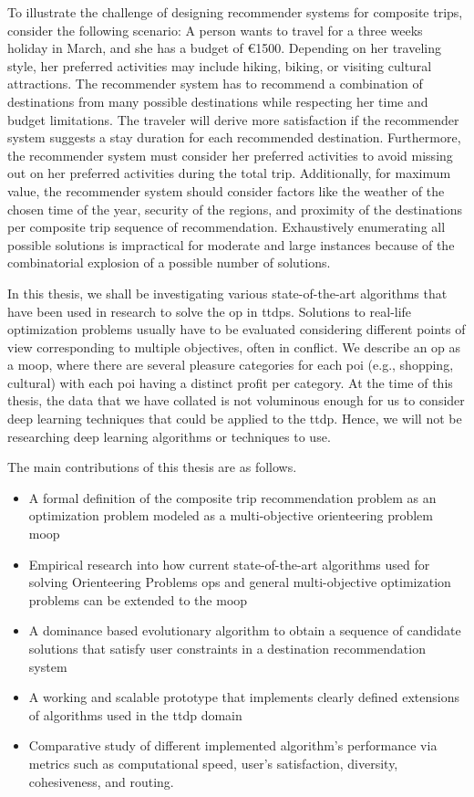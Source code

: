 To illustrate the challenge of designing recommender systems for composite trips, consider the following scenario: A person wants to travel for a three weeks holiday in March, and she has a budget of €1500. Depending on her traveling style, her preferred activities may include hiking, biking, or visiting cultural attractions. The recommender system has to recommend a combination of destinations from many possible destinations while respecting her time and budget limitations. The traveler will derive more satisfaction if the recommender system suggests a stay duration for each recommended destination. Furthermore, the recommender system must consider her preferred activities to avoid missing out on her preferred activities during the total trip. Additionally, for maximum value, the recommender system should consider factors like the weather of the chosen time of the year, security of the regions, and proximity of the destinations per composite trip sequence of recommendation. Exhaustively enumerating all possible solutions is impractical for moderate and large instances because of the combinatorial explosion of a possible number of solutions.

In this thesis, we shall be investigating various state-of-the-art algorithms that have been used in research to solve the \gls{op} in \glspl{ttdp}. Solutions to real-life optimization problems usually have to be evaluated considering different points of view corresponding to multiple objectives, often in conflict.  We describe an \gls{op} as a \gls{moop}, where there are several pleasure categories for each \gls{poi} (e.g., shopping, cultural) with each \gls{poi} having a distinct profit per category. At the time of this thesis, the data that we have collated is not voluminous enough for us to consider deep learning techniques that could be applied to the \gls{ttdp}. Hence, we will not be researching deep learning algorithms or techniques to use.

The main contributions of this thesis are as follows.

\begin{itemize}
    \item A formal definition of the composite trip recommendation problem as an optimization problem modeled as a multi-objective orienteering problem \gls{moop}
    \item Empirical research into how current state-of-the-art algorithms used for solving Orienteering Problems \glspl{op} and general multi-objective optimization problems can be extended to the \gls{moop}
    \item A dominance based evolutionary algorithm to obtain a sequence of candidate solutions that satisfy user constraints in a destination recommendation system
    \item A working and scalable prototype that implements clearly defined extensions of algorithms used in the \gls{ttdp} domain
    \item Comparative study of different implemented algorithm's performance via metrics such as computational speed, user's satisfaction, diversity, cohesiveness, and routing.
\end{itemize}


